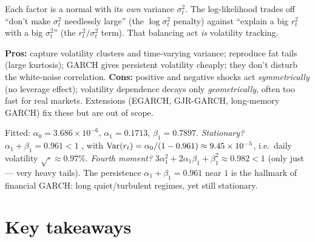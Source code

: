 \documentclass[11pt]{article}
\begin{document}
\begin{intu}
Each factor is a normal with its \emph{own} variance $\sigma_t^2$. The log-likelihood trades off
``don't make $\sigma_t^2$ needlessly large'' (the $\log\sigma_t^2$ penalty) against ``explain a big
$r_t^2$ with a big $\sigma_t^2$'' (the $r_t^2/\sigma_t^2$ term). That balancing act \emph{is}
volatility tracking.
\end{intu}

\begin{intu}
\textbf{Pros:} capture volatility clusters and time-varying variance; reproduce fat tails (large
kurtosis); GARCH gives persistent volatility cheaply; they don't disturb the white-noise
correlation. \textbf{Cons:} positive and negative shocks act \emph{symmetrically} (no leverage
effect); volatility dependence decays only \emph{geometrically}, often too fast for real markets.
Extensions (EGARCH, GJR-GARCH, long-memory GARCH) fix these but are out of scope.
\end{intu}

\begin{exmpl}
Fitted: $\alpha_0=3.686\times10^{-6}$, $\alpha_1=0.1713$, $\beta_1=0.7897$.
\emph{Stationary?} $\alpha_1+\beta_1=0.961<1$ \checkmark, with
$\operatorname{Var}(r_t)=\alpha_0/(1-0.961)\approx9.45\times10^{-5}$, i.e.\ daily volatility
$\sqrt{\cdot}\approx0.97\%$. \emph{Fourth moment?}
$3\alpha_1^2+2\alpha_1\beta_1+\beta_1^2\approx0.982<1$ \checkmark (only just --- very heavy tails).
The persistence $\alpha_1+\beta_1=0.961$ near $1$ is the hallmark of financial GARCH: long
quiet/turbulent regimes, yet still stationary.
\end{exmpl}

\section*{Key takeaways}
\end{document}
